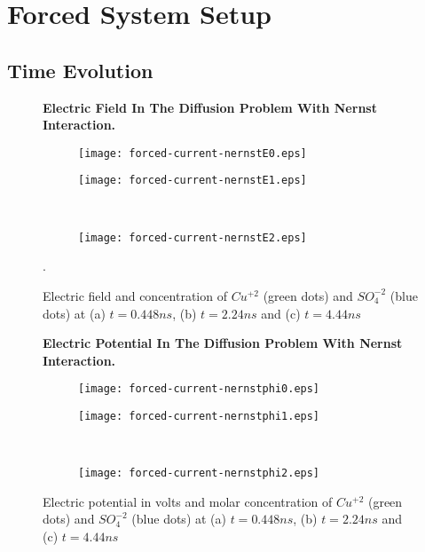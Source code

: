 \section{Forced System Setup}

\subsection{Time Evolution}



\begin{figure}[htbp]
\centering
\textbf{Electric Field In The Diffusion Problem With Nernst Interaction.}\par\medskip
\begin{subfigure}{.5\linewidth}
\centering
\texttt{[image: forced-current-nernstE0.eps]}
\caption{}
\label{fig:ef1}
\end{subfigure}%
\begin{subfigure}{.5\linewidth}
\centering
\texttt{[image: forced-current-nernstE1.eps]}
\caption{}
\label{fig:ef2}
\end{subfigure}\\[1ex]
\begin{subfigure}{\linewidth}
\centering
\texttt{[image: forced-current-nernstE2.eps]}
\caption{}
\label{fig:ef3}
\end{subfigure}
\caption{Electric field and concentration of $Cu^{+2}$ (green dots) and $SO_4^{-2}$ (blue dots) at (a) $t = 0.448 ns$, (b) $t = 2.24 ns$ and (c) $t = 4.44 ns$}.
\label{fig:test}
\end{figure}

\begin{figure}[htbp]
\centering
\textbf{Electric Potential In The Diffusion Problem With Nernst Interaction.}\par\medskip
\begin{subfigure}{.5\linewidth}
\centering
\texttt{[image: forced-current-nernstphi0.eps]}
\caption{}
\label{fig:ef1}
\end{subfigure}%
\begin{subfigure}{.5\linewidth}
\centering
\texttt{[image: forced-current-nernstphi1.eps]}
\caption{}
\label{fig:ef2}
\end{subfigure}\\[1ex]
\begin{subfigure}{\linewidth}
\centering
\texttt{[image: forced-current-nernstphi2.eps]}
\caption{}
\label{fig:ef3}
\end{subfigure}
\caption{Electric potential in volts and molar concentration of $Cu^{+2}$ (green dots) and $SO_4^{-2}$ (blue dots) at (a) $t = 0.448 ns$, (b) $t = 2.24 ns$ and (c) $t = 4.44 ns$}
\label{fig:test}
\end{figure}

\newpage





